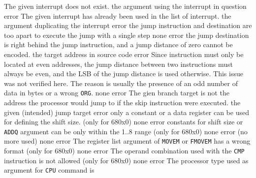 \documentclass[12pt,twoside]{report}
\newcommand{\tty}[1]{{\tt #1}}
\begin{document}
\begin{description}
               {The given interrupt does not exist.}
               {the argument using the interrupt in question}
               {error}
               {The given interrupt has already been used in the list of interrupt.}
               {the argument duplicating the interrupt}
               {error}
               {the jump instruction and destination are too apart to
                execute the jump with a single step}
               {none}
               {error}
               {the jump destination is right behind the jump instruction,
                and a jump distance of zero cannot be encoded.}
               {the target address in source code}
               {error}
               {Since instruction must only be located at even addresses,
                the jump distance between two instructions must always be
                even, and the LSB of the jump distance is used otherwise.
                This issue was not verified here. The reason is usually the
                presence of an odd number of data in bytes or a wrong
                \tty{ORG}.}
               {none}
               {error}
               {The gien branch target is not the address the processor would
                jump to if the skip instruction were executed.}
               {the given (intended) jump target}
               {error}
               {only a constant or a data register can be used for defining
                the shift size. (only for 680x0)}
               {none}
               {error}
               {constants for shift size or \tty{ADDQ} argument can be only
                within the 1..8 range (only for 680x0)}
               {none}
               {error}
               {(no more used)}
               {none}
               {error}
               {The register list argument of \tty{MOVEM} or \tty{FMOVEM} has a
                wrong format (only for 680x0)}
               {none}
               {error}
               {The operand combination used with the \tty{CMP} instruction is
                not allowed (only for 680x0)}
               {none}
               {error}
               {The processor type used as argument for \tty{CPU} command is
}
\end{description}
\end{document}
